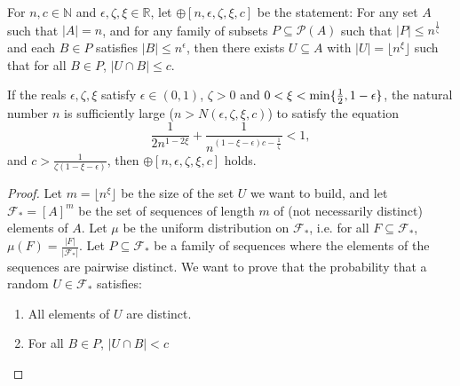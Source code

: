         \begin{definition} \label{def:n_large_enough_property}
            For $n, c \in \mathbb{N}$ and $\epsilon, \zeta, \xi \in \mathbb{R}$, let $\oplus[n, \epsilon, \zeta, \xi, c]$ be
            the statement:
            For any set $A$ such that $|A| = n$, and for any family of subsets $P \subseteq \mathcal{P}(A)$ such that
            $|P| \leq n^{\frac{1}{\zeta}}$ and each $B \in P$ satisfies $|B| \leq n^\epsilon$, then there exists $U \subseteq A$
            with $|U| = \lfloor n^\xi \rfloor$ such that for all $B \in P$, $|U \cap B| \leq c$.
        \end{definition}

        \begin{lemma} \label{lem:n_large_enough_valid_values}
            If the reals $\epsilon, \zeta, \xi$ satisfy $\epsilon \in (0,1)$, $\zeta > 0$ and $0 < \xi < \min \{ \frac{1}{2}, 1 - \epsilon \}$,
            the natural number $n$ is sufficiently large ($n > N(\epsilon, \zeta, \xi, c)$) to satisfy the equation
                \begin{equation} \label{eq:n_large_enough_valid_values.1}
                    \frac{1}{2n^{1-2\xi}} + \frac{1}{n^{(1 - \xi - \epsilon)c - \frac{1}{\zeta}}} < 1,
                \end{equation}
            and $c > \frac{1}{\zeta (1 - \xi - \epsilon)}$,
            then $\oplus[n, \epsilon, \zeta, \xi, c]$ holds.
            \begin{proof}
                Let $m = \lfloor n^\xi \rfloor$ be the size of the set $U$ we want to build, and let $\mathcal{F}_* = [A]^m$ be
                the set of sequences of length $m$ of (not necessarily distinct) elements of $A$.
                Let $\mu$ be the uniform distribution on $\mathcal{F}_*$, i.e. for all $F \subseteq \mathcal{F}_*$,
                $\mu(F) = \frac{|F|}{|\mathcal{F}_*|}$.
                Let $P \subseteq \mathcal{F}_*$ be a family of sequences where the elements of the sequences are pairwise distinct.
                We want to prove that the probability that a random $U \in \mathcal{F}_*$ satisfies:
                \begin{enumerate}[label={\Roman*}., ref={\Roman*}, font=\rmfamily]
                    \item\label{itm:n_large_enough_valid_values.1} All elements of $U$ are distinct.
                    \item\label{itm:n_large_enough_valid_values.2} For all $B \in P$, $|U \cap B| < c$

\end{enumerate}
\end{proof}
\end{lemma}
